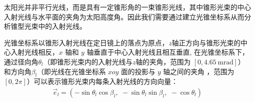 \documentclass[../main.tex]{subfiles}
\begin{document}
  \par 太阳光并非平行光线，而是具有一定锥形角的一束锥形光线，其中锥形光束的中心入射光线与水平面的夹角为太阳高度角。因此我们需要通过建立光锥坐标系从而分析锥型光束中的入射光线。
  \par 光锥坐标系以锥形入射光线在定日镜上的落点为原点，$z$轴正方向与锥形光束的中心入射光线相反，\( x \) 轴和 \( y \) 轴垂直于中心入射光线且相互垂直, 
在光锥坐标系下，通过径向角$\theta _l$（即锥形光束内的入射光线与$z$轴的夹角，范围为 \([0, 4.65\ \mathrm{mrad}]\)）和方向角$\beta _l$（即光线在光锥坐标系 \( xoy \) 面的投影与 \( y\) 轴之间的夹角 ，范围为 \([0, 2\pi]\)）可以表示锥形光束内每条入射光线的方向向量：  
\begin{align}    \label{1.3}
\vec{e}_l=\left( -\sin \theta _l\cos \beta _l,\,\,-\sin \theta _l\sin \beta _l,\,\,-\cos \theta _l \right)
\end{align} 
\end{document}
